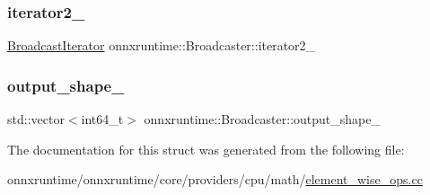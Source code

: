 \mbox{\label{structonnxruntime_1_1Broadcaster_a3183a531f4cb4a64e65b17b8ac89bfd1}} 
\subsubsection{\texorpdfstring{iterator2\+\_\+}{iterator2\_}}
{\footnotesize\ttfamily \mbox{\hyperlink{structonnxruntime_1_1BroadcastIterator}{Broadcast\+Iterator}} onnxruntime\+::\+Broadcaster\+::iterator2\+\_\+}

\mbox{\label{structonnxruntime_1_1Broadcaster_a3bdfd2716dd93da8ba271c8ad0804415}} 
\subsubsection{\texorpdfstring{output\+\_\+shape\+\_\+}{output\_shape\_}}
{\footnotesize\ttfamily std\+::vector$<$int64\+\_\+t$>$ onnxruntime\+::\+Broadcaster\+::output\+\_\+shape\+\_\+}



The documentation for this struct was generated from the following file\+:\begin{DoxyCompactItemize}
\item 
onnxruntime/onnxruntime/core/providers/cpu/math/\mbox{\hyperlink{element__wise__ops_8cc}{element\+\_\+wise\+\_\+ops.\+cc}}\end{DoxyCompactItemize}
